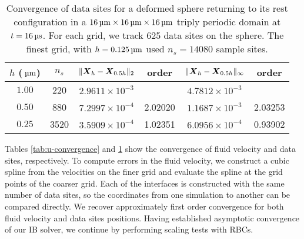 \begin{table*}[ht]
    \caption{%
Convergence of data sites for a deformed sphere returning to its rest
configuration in a $16\um\times16\um\times16\um$ triply periodic domain at
$t=16\us$. For each grid, we track 625 data sites on the sphere. The finest
grid, with $h = 0.125\um$ used $n_s=14080$ sample sites.
    }\label{tab:x-convergence}
    \begin{center}
        \begingroup
        \setlength{\tabcolsep}{9pt}
        \renewcommand{\arraystretch}{1.5}
        \begin{tabular}{cc|cc|cc}
                                                                                                             \\ \toprule
            $h$ ($\um$) & $n_s$ & $\|\boldsymbol{X}_h-\boldsymbol{X}_{0.5h}\|_2$ & order   & $\|\boldsymbol{X}_h-\boldsymbol{X}_{0.5h}\|_{\infty}$ & order   \\ \midrule
            $1.00$      & 220   & $2.9611\times10^{-3}$  &         & $4.7812\times10^{-3}$         &         \\
            $0.50$      & 880   & $7.2997\times10^{-4}$  & 2.02020 & $1.1687\times10^{-3}$         & 2.03253 \\
            $0.25$      & 3520  & $3.5909\times10^{-4}$  & 1.02351 & $6.0956\times10^{-4}$         & 0.93902 \\ \bottomrule
        \end{tabular}
        \endgroup
    \end{center}
\end{table*}

Tables \ref{tab:u-convergence} and \ref{tab:x-convergence} show the convergence
of fluid velocity and data sites, respectively. To compute errors in the fluid
velocity, we construct a cubic spline from the velocities on the finer grid
and evaluate the spline at the grid points of the coarser grid. Each of the
interfaces is constructed with the same number of data sites, so the
coordinates from one simulation to another can be compared directly. We recover
approximately first order convergence for both fluid velocity and data sites
positions. Having established asymptotic convergence of our IB solver, we
continue by performing scaling tests with RBCs.
